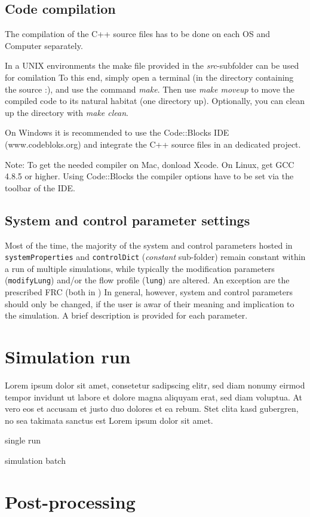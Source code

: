 \subsection{Code compilation} \label{ssec:code_compilation}
The compilation of the C++ source files has to be done on each OS and Computer separately.

In a UNIX environments the make file provided in the \textit{src}-subfolder can be used for comilation
To this end, simply open a terminal (in the directory containing the source :), and use the command \textit{make}.
Then use \textit{make moveup} to move the compiled code to its natural habitat (one directory up).
Optionally, you can clean up the directory with \textit{make clean}.

On Windows it is recommended to use the Code::Blocks IDE (www.codebloks.org) and integrate the C++ source files in an dedicated project.

Note: To get the needed compiler on Mac, donload Xcode. On Linux, get GCC 4.8.5 or higher. Using Code::Blocks the compiler options have to be set via the toolbar of the IDE.

\subsection{System and control parameter settings} \label{ssec:parameter_settingss}
Most of the time, the majority of the system and control parameters hosted in \texttt{systemProperties} and \texttt{controlDict} (\textit{constant} sub-folder) remain constant within a run of multiple simulations, while typically the modification parameters (\texttt{modifyLung}) and/or the flow profile (\texttt{lung}) are altered.
An exception are the prescribed FRC (both in )
In general, however, system and control parameters should only be changed, if the user is awar of their meaning and implication to the simulation.
A brief description is provided for each parameter.


\section{Simulation run} \label{sec:simulation_run}
Lorem ipsum dolor sit amet, consetetur sadipscing elitr, sed diam nonumy eirmod tempor invidunt ut labore et dolore magna aliquyam erat, sed diam voluptua. At vero eos et accusam et justo duo dolores et ea rebum. Stet clita kasd gubergren, no sea takimata sanctus est Lorem ipsum dolor sit amet.
\begin{description}
  \item single run
  \item simulation batch
\end{description}




\section{Post-processing} \label{sec:post_processing}

